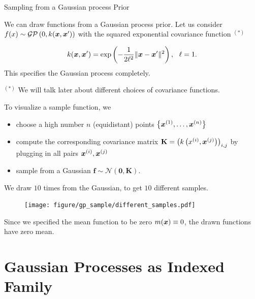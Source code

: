 \begin{vbframe}{Sampling from a Gaussian process Prior}

We can draw functions from a Gaussian process prior. Let us consider $f(x) \sim \mathcal{GP}\left(0, k(\bm{x}, \bm{x}^\prime)\right)$ with the squared exponential covariance function $^{(*)}$

$$
k(\bm{x}, \bm{x}^\prime) = \exp\left(-\frac{1}{2\ell^2}\|\bm{x} - \bm{x}^\prime\|^2\right), ~~ \ell = 1.
$$
\vspace{-4cm}
This specifies the Gaussian process completely. 

\vspace{8cm}
\footnotesize
$^{(*)}$ We will talk later about different choices of covariance functions. 

\normalsize

\framebreak 

To visualize a sample function, we 

\begin{itemize}
  \item choose a high number $n$ (equidistant) points $\left\{\bm{x}^{(1)}, \dots, \bm{x}^{(n)}\right\}$
  \item compute the corresponding covariance matrix $\mathbf{K} = \left(k\left(x^{(i)}, \bm{x}^{(j)}\right)\right)_{i,j}$ by plugging in all pairs $\bm{x}^{(i)}, \bm{x}^{(j)}$ 
  \item sample from a Gaussian $\bm{f} \sim \mathcal{N}(\bm{0}, \bm{K})$. 
\end{itemize}

We draw $10$ times from the Gaussian, to get $10$ different samples.  



\begin{figure}
  \texttt{[image: figure/gp\_sample/different\_samples.pdf]}
\end{figure}

\vspace{-0.2cm}
Since we specified the mean function to be zero $m(\bm{x}) \equiv 0$, the drawn functions have zero mean.

\end{vbframe}


\section{Gaussian Processes as Indexed Family}




